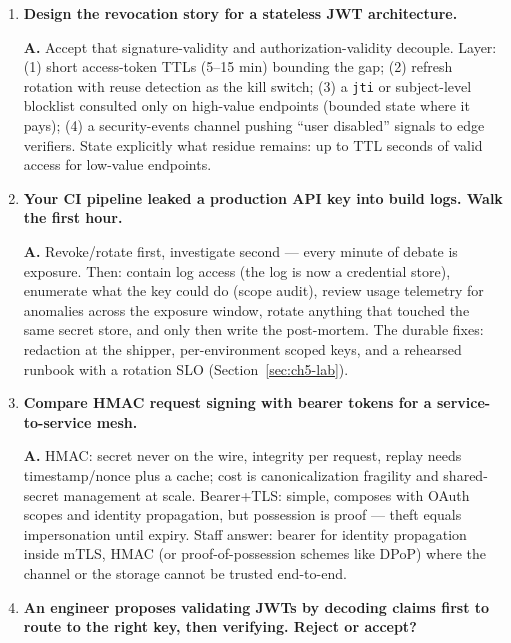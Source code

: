 \begin{enumerate}[label=\textbf{Q\arabic*.}, leftmargin=1.7cm, itemsep=0.9em, start=23]
  \item \textbf{Design the revocation story for a stateless JWT
        architecture.}\par
        \textbf{A.} Accept that signature-validity and authorization-validity
        decouple. Layer: (1) short access-token TTLs (5--15 min) bounding
        the gap; (2) refresh rotation with reuse detection as the kill
        switch; (3) a \texttt{jti} or subject-level blocklist consulted only
        on high-value endpoints (bounded state where it pays); (4) a
        security-events channel pushing ``user disabled'' signals to edge
        verifiers. State explicitly what residue remains: up to TTL seconds
        of valid access for low-value endpoints.
  \item \textbf{Your CI pipeline leaked a production API key into build
        logs. Walk the first hour.}\par
        \textbf{A.} Revoke/rotate first, investigate second --- every minute
        of debate is exposure. Then: contain log access (the log is now a
        credential store), enumerate what the key could do (scope audit),
        review usage telemetry for anomalies across the exposure window,
        rotate anything that touched the same secret store, and only then
        write the post-mortem. The durable fixes: redaction at the shipper,
        per-environment scoped keys, and a rehearsed runbook with a rotation
        SLO (Section~\ref{sec:ch5-lab}).
  \item \textbf{Compare HMAC request signing with bearer tokens for a
        service-to-service mesh.}\par
        \textbf{A.} HMAC: secret never on the wire, integrity per request,
        replay needs timestamp/nonce plus a cache; cost is canonicalization
        fragility and shared-secret management at scale. Bearer+TLS: simple,
        composes with OAuth scopes and identity propagation, but possession
        is proof --- theft equals impersonation until expiry. Staff answer:
        bearer for identity propagation inside mTLS, HMAC (or
        proof-of-possession schemes like DPoP) where the channel or the
        storage cannot be trusted end-to-end.
  \item \textbf{An engineer proposes validating JWTs by decoding claims
        first to route to the right key, then verifying. Reject or
        accept?}\par

\end{enumerate}
